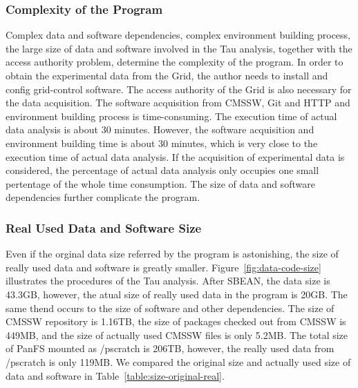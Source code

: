 \documentclass{acm_proc_article-sp}
\begin{document}
\subsubsection{Complexity of the Program}
Complex data and software dependencies, complex environment building process, the large size of data and software involved in the Tau analysis, together with the access authority problem, determine the complexity of the program. 
In order to obtain the experimental data from the Grid, the author needs to install and config grid-control software. 
The access authority of the Grid is also necessary for the data acquisition.
The software acquisition from CMSSW, Git and HTTP and environment building process is time-consuming. The execution time of actual data analysis is about 30 minutes. However, the software acquisition and environment building time is about 30 minutes, which is very close to the execution time of actual data analysis. If the acquisition of experimental data is considered, the percentage of actual data analysis only occupies one small pertentage of the whole time consumption.
The size of data and software dependencies further complicate the program.

\subsubsection{Real Used Data and Software Size} 

Even if the orginal data size referred by the program is astonishing, the size
of really used data and software is greatly smaller.
Figure~\ref{fig:data-code-size} illustrates the procedures of the Tau analysis.
After SBEAN, the data size is 43.3GB, however, the atual size of really used
data in the program is 20GB.  The same thend occurs to the size of software and
other dependencies. The size of CMSSW repository is 1.16TB, the size of
packages checked out from CMSSW is 449MB, and the size of actually used CMSSW
files is only 5.2MB. 
The total size of PanFS mounted as /pscratch is 206TB, however, the really used data from /pscratch is only 119MB.
We compared the original size and actually used size of data and software in Table~\ref{table:size-original-real}.
\end{document}
